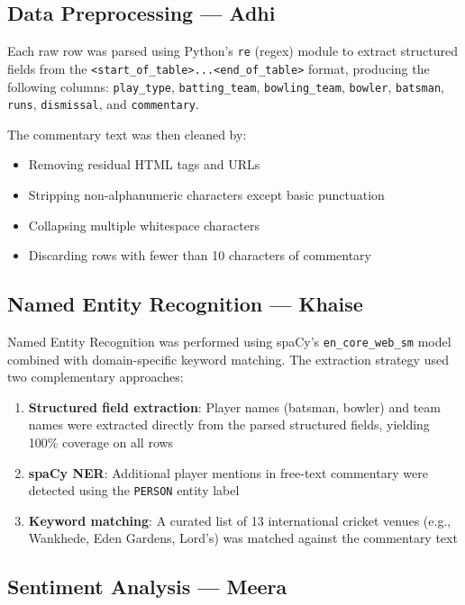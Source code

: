 \documentclass[12pt,a4paper]{article}
\begin{document}
\subsection{Data Preprocessing — Adhi}

Each raw row was parsed using Python's \texttt{re} (regex) module to extract structured fields from the \texttt{<start\_of\_table>...<end\_of\_table>} format, producing the following columns: \texttt{play\_type}, \texttt{batting\_team}, \texttt{bowling\_team}, \texttt{bowler}, \texttt{batsman}, \texttt{runs}, \texttt{dismissal}, and \texttt{commentary}.

The commentary text was then cleaned by:
\begin{itemize}[leftmargin=1.5em]
  \item Removing residual HTML tags and URLs
  \item Stripping non-alphanumeric characters except basic punctuation
  \item Collapsing multiple whitespace characters
  \item Discarding rows with fewer than 10 characters of commentary
\end{itemize}

\subsection{Named Entity Recognition — Khaise}

Named Entity Recognition was performed using spaCy's \texttt{en\_core\_web\_sm} model combined with domain-specific keyword matching. The extraction strategy used two complementary approaches:

\begin{enumerate}[leftmargin=1.5em]
  \item \textbf{Structured field extraction}: Player names (batsman, bowler) and team names were extracted directly from the parsed structured fields, yielding 100\% coverage on all rows
  \item \textbf{spaCy NER}: Additional player mentions in free-text commentary were detected using the \texttt{PERSON} entity label
  \item \textbf{Keyword matching}: A curated list of 13 international cricket venues (e.g., Wankhede, Eden Gardens, Lord's) was matched against the commentary text
\end{enumerate}

\subsection{Sentiment Analysis — Meera}
\end{document}
